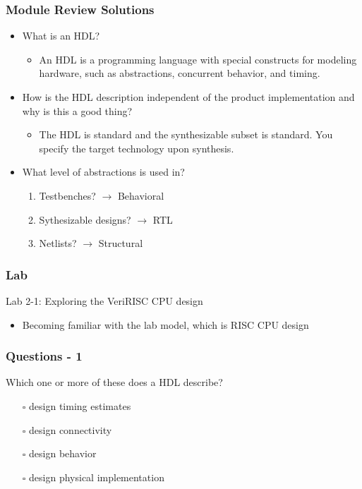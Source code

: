 \documentclass[t]{beamer}
\begin{document}
\begin{frame}
\frametitle{Module Review Solutions}

\begin{itemize}
\item What is an HDL?
\begin{itemize}
	\item An HDL is a programming language with special constructs for modeling hardware, such as abstractions, concurrent behavior, and timing.
\end{itemize}
\item How is the HDL description independent of the product implementation and why is this a good thing?
\begin{itemize}
	\item The HDL is standard and the synthesizable subset is standard. You specify the target technology upon synthesis.
\end{itemize}
\item What level of abstractions is used in?
\begin{enumerate}
	\item Testbenches? $\rightarrow$ Behavioral
	\item Sythesizable designs? $\rightarrow$ RTL
	\item Netlists? $\rightarrow$ Structural
\end{enumerate}
\end{itemize}
\end{frame}

\begin{frame}
\frametitle{Lab}

Lab 2-1: Exploring the VeriRISC CPU design

\begin{itemize}
\item Becoming familiar with the lab model, which is RISC CPU design
\end{itemize}
\end{frame}

\begin{frame}
\frametitle{Questions - 1}

Which one or more of these does a HDL describe?

\begin{itemize}
\item[$\square$] design timing estimates
\item[$\square$] design connectivity
\item[$\square$] design behavior
\item[$\square$] design physical implementation
\end{itemize}
\end{frame}
\end{document}
